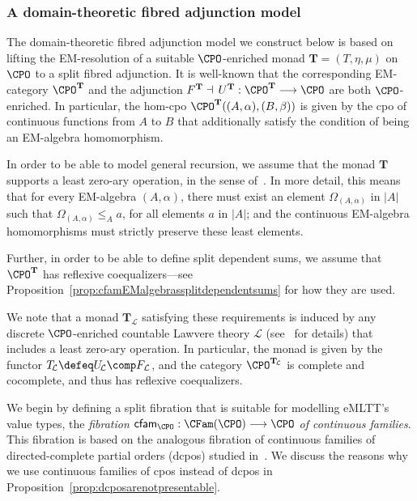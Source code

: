\subsubsection{A domain-theoretic fibred adjunction model}
\label{sect:domaintheoreticfibredadjunctionmodel}

The domain-theoretic fibred adjunction model we construct below is based on lifting the EM-resolution of a suitable $\CPO$-enriched monad $\mathbf{T} = (T,\eta,\mu)$ on $\CPO$ to a split fibred adjunction. It is well-known that the corresponding EM-category $\CPO^{\mathbf{T}}$ and the adjunction $F^{\mathbf{T}} \dashv\, U^{\mathbf{T}} : \CPO^{\mathbf{T}} \longrightarrow \CPO$ are both  $\CPO$-enriched. In particular, the hom-cpo $\CPO^{\mathbf{T}}((A,\alpha),(B,\beta))$ is given by the cpo of continuous functions from $A$ to $B$ that additionally satisfy the condition of being an EM-algebra homomorphism. 

In order to be able to model general recursion, we assume that the monad $\mathbf{T}$ supports a least zero-ary operation, in the sense of~\cite[Section~6]{Plotkin:SemanticsForAlgOperations}. In more detail, this means that for every EM-algebra $(A,\alpha)$, there must exist an element $\Omega_{(A,\alpha)}$ in $\vert A \vert$ such that $\Omega_{(A,\alpha)} \leq_A a$, for all elements $a$ in $\vert A \vert$; and the continuous EM-algebra homomorphisms must strictly preserve these least elements.

Further, in order to be able to define split dependent sums, we assume that $\CPO^{\mathbf{T}}$ has reflexive coequalizers---see Proposition~\ref{prop:cfamEMalgebrassplitdependentsums} for how they are used.

We note that a monad $\mathbf{T}_{\!\mathcal{L}}$ satisfying these requirements is induced by any  discrete $\CPO$-enriched countable Lawvere theory $\mathcal{L}$ (see~\cite{Hyland:DiscreteLawTh} for details) that includes a least zero-ary operation. In particular, the monad is given by the functor $T_{\!\mathcal{L}} \defeq U_{\!\mathcal{L}} \comp F_{\mathcal{L}}$, and the category $\CPO^{\mathbf{T}_{\!\mathcal{L}}}$ is complete and cocomplete, and thus has reflexive coequalizers.

We begin by defining a split fibration that is suitable for modelling eMLTT's value types, the \emph{fibration $\mathsf{cfam}_{\CPO} : \CFam(\CPO) \longrightarrow \CPO$ of continuous families}. This fibration is based on the analogous fibration of continuous families of directed-complete partial orders (dcpos) studied in~\cite[Section~10.6]{Jacobs:Book}. We discuss the reasons why we use continuous families of cpos instead of dcpos in Proposition~\ref{prop:dcposarenotpresentable}.

